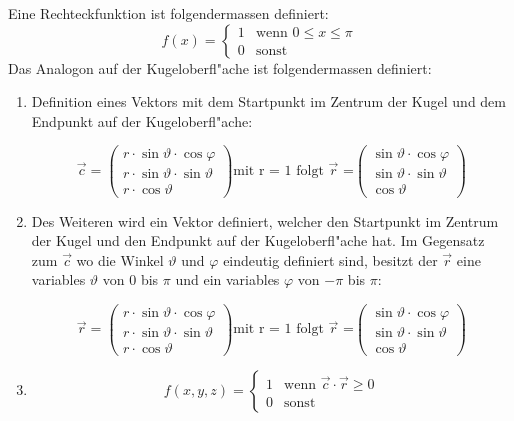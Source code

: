 \begin{refsection}
Eine Rechteckfunktion ist folgendermassen definiert:
\[
f(x) =
\begin{cases}
1 & \text{wenn } 0 \leq x \leq \pi\\
0 & \text{sonst }
\end{cases}
\]
Das Analogon auf der Kugeloberfl"ache ist folgendermassen definiert:
\begin{enumerate}

\item Definition eines Vektors mit dem Startpunkt im Zentrum der Kugel
und dem Endpunkt auf der Kugeloberfl"ache:

$$
\vec{c} = 
\begin{pmatrix}
{r \cdot \sin\vartheta \cdot \cos\varphi}\\
{r \cdot \sin\vartheta \cdot \sin\vartheta}\\
{r \cdot \cos\vartheta}
\end{pmatrix}
\text{mit r = 1 folgt $\vec{r}$ =}
\begin{pmatrix}
{\sin\vartheta \cdot \cos\varphi}\\
{\sin\vartheta \cdot \sin\vartheta}\\
{\cos\vartheta}
\end{pmatrix}
$$

\item	Des Weiteren wird ein Vektor definiert, welcher den Startpunkt
im Zentrum der Kugel und den Endpunkt auf der Kugeloberfl"ache hat. 
Im Gegensatz zum $\vec{c}$ wo die Winkel $\vartheta$ und $\varphi$ 
eindeutig definiert sind, besitzt der $\vec{r}$ eine variables 
$\vartheta$ von 0 bis $\pi$ und ein variables $\varphi$ von $-\pi$ 
bis $\pi$: 

$$
\vec{r} = 
\begin{pmatrix}
{r \cdot \sin\vartheta \cdot \cos\varphi}\\
{r \cdot \sin\vartheta \cdot \sin\vartheta}\\
{r \cdot \cos\vartheta}
\end{pmatrix}
\text{mit r = 1 folgt $\vec{r}$ =}
\begin{pmatrix}
{\sin\vartheta \cdot \cos\varphi}\\
{\sin\vartheta \cdot \sin\vartheta}\\
{\cos\vartheta}
\end{pmatrix}
$$

\item
\[
f(x,y,z) =\begin{cases}
1 & \text{wenn } \vec c\cdot\vec r \ge 0\\
0 & \text{sonst}
\end{cases}
\]
\end{enumerate}


\end{refsection}
